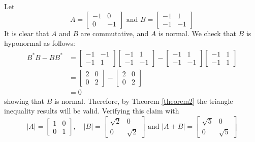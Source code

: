 \begin{example}
    Let \[ A = 
    \begin{bmatrix}
        -1 & 0 \\
        0 & -1
    \end{bmatrix} \text{ and }
    B = \begin{bmatrix}
        -1 & 1\\ 
        -1 & -1
    \end{bmatrix} \]
    It is clear that \(A\) and \(B\) are commutative, and \(A\) is normal. We check that \(B\) is hyponormal as follows: 
    \begin{align*}
        B^*B - BB^* &=
        \begin{bmatrix}
            -1 & -1\\ -1 & 1
        \end{bmatrix}
        \begin{bmatrix}
            -1 & 1 \\ -1 & -1
        \end{bmatrix}
        -
        \begin{bmatrix}
            -1 & 1 \\ -1 & -1
        \end{bmatrix}
        \begin{bmatrix}
            -1 & 1\\ -1 & 1
        \end{bmatrix}\\
        &=
        \begin{bmatrix}
            2 & 0 \\ 0 & 2
        \end{bmatrix}
        - 
        \begin{bmatrix}
            2 & 0 \\ 0 & 2
        \end{bmatrix}\\
        &= 0
    \end{align*}
    showing that \(B\) is normal. Therefore, by Theorem \ref{theorem2} the triangle inequality results will be valid. Verifying this claim with 
    \[
    |A| = \begin{bmatrix} 1 & 0 \\ 0 & 1 \end{bmatrix}, \quad
    |B| = \begin{bmatrix}  \sqrt{2} & 0 \\ 0 & \sqrt{2} \end{bmatrix} \text{ and }
    |A+B| = \begin{bmatrix} \sqrt{5} & 0 \\ 0 & \sqrt{5}   \end{bmatrix}
\]
\end{example}

